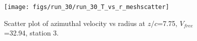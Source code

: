 \begin{figure}[H]
\centering
\texttt{[image: figs/run\_30/run\_30\_T\_vs\_r\_meshscatter]}
\caption{Scatter plot of azimuthal velocity vs radius at $z/c$=7.75, $V_{free}$=32.94, station 3.}
\label{fig:run_30_T_vs_r_meshscatter}
\end{figure}


